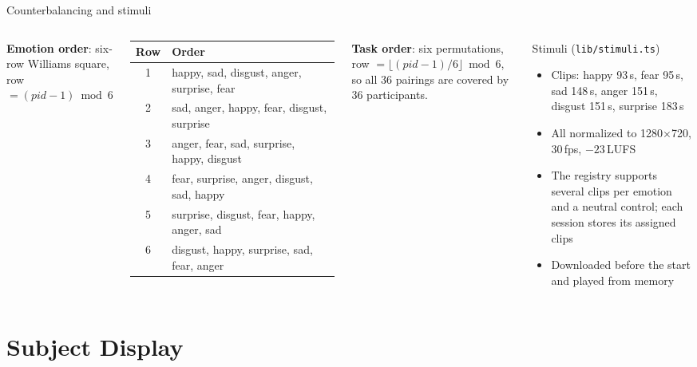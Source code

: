 \documentclass[aspectratio=169,11pt]{beamer}
\newcommand{\code}[1]{{\small\texttt{#1}}}
\begin{document}
\begin{frame}{Counterbalancing and stimuli}
  \begin{columns}[T]
    \textbf{Emotion order}: six-row Williams square, row $=(\mathit{pid}-1)\bmod 6$
    \vspace{0.2em}

    \scriptsize
    \begin{tabular}{@{}c l@{}}
      \toprule
      Row & Order \\
      \midrule
      1 & happy, sad, disgust, anger, surprise, fear \\
      2 & sad, anger, happy, fear, disgust, surprise \\
      3 & anger, fear, sad, surprise, happy, disgust \\
      4 & fear, surprise, anger, disgust, sad, happy \\
      5 & surprise, disgust, fear, happy, anger, sad \\
      6 & disgust, happy, surprise, sad, fear, anger \\
      \bottomrule
    \end{tabular}
    \vspace{0.3em}

    \small\textbf{Task order}: six permutations, row $=\lfloor(\mathit{pid}-1)/6\rfloor \bmod 6$, so all 36 pairings are covered by 36 participants.
    \begin{block}{Stimuli (\code{lib/stimuli.ts})}
      \footnotesize
      \begin{itemize}
        \item Clips: happy 93\,s, fear 95\,s, sad 148\,s, anger 151\,s, disgust 151\,s, surprise 183\,s
        \item All normalized to 1280$\times$720, 30\,fps, $-23$\,LUFS
        \item The registry supports several clips per emotion and a neutral control; each session stores its assigned clips
        \item Downloaded before the start and played from memory
      \end{itemize}
    \end{block}
  \end{columns}
\end{frame}

\section{Subject Display}
\end{document}
